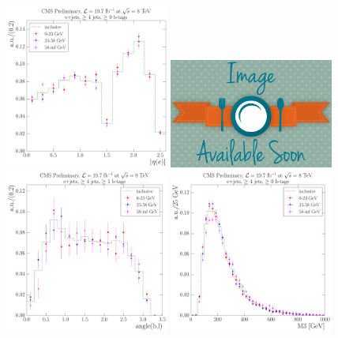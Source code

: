 \begin{figure}[hbtp]
    \centering
     \includegraphics[width=0.48\textwidth]{Chapters/04_Analysis/04b_XSections/images/8TeV/fit_variables/MT/electron_absolute_eta/qcd/MT_electron_absolute_eta_0orMoreBtag_QCD_template_comparison.pdf}\hfill
     \includegraphics[width=0.48\textwidth]{Chapters/04_Analysis/04b_XSections/images/placeholder.png}\hfill
     \includegraphics[width=0.48\textwidth]{Chapters/04_Analysis/04b_XSections/images/8TeV/fit_variables/MT/angle_bl/qcd/MT_angle_bl_1orMoreBtag_QCD_template_comparison.pdf}\hfill
     \includegraphics[width=0.48\textwidth]{Chapters/04_Analysis/04b_XSections/images/8TeV/fit_variables/MT/M3/qcd/MT_M3_0orMoreBtag_QCD_template_comparison.pdf}\\

\end{figure}
